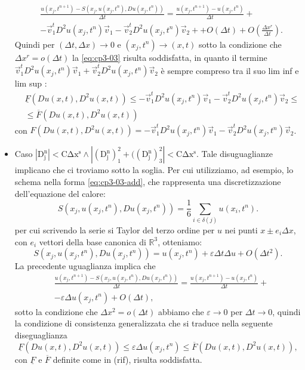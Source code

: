\begin{itemize}
\[\begin{split}
  &\frac{u(x_j,t^{n+1})-S(x_j,u(x_j,t^n),Du(x_j,t^n))}{\Delta t}= \frac{u(x_j,t^{n+1})-u(x_j,t^n)}{\Delta t} + \\
  &  -\vec{v}_1^tD^2u(x_j,t^n)\vec{v}_1 -\vec{v}_2^tD^2u(x_j,t^n)\vec{v}_2 + 
   + O(\Delta t) + O(\frac{\Delta x^r}{\Delta t}).
\end{split}
\]
Quindi per  $(\Delta t,\Delta x)\to 0$ e $(x_j,t^n)\to(x,t)$ sotto la condizione che $\Delta x^r = o(\Delta t)$ la \eqref{eq:cp3-03} risulta soddisfatta, in quanto il termine $\vec{v}_1^tD^2u(x_j,t^n)\vec{v}_1 +\vec{v}_2^tD^2u(x_j,t^n)\vec{v}_2 $ è sempre compreso tra il suo lim inf e lim sup :
\[
\begin{split}
  &\underline{F}(Du(x,t),D^2u(x,t))\le-\vec{v}_1^tD^2u(x_j,t^n)\vec{v}_1
  -\vec{v}_2^tD^2u(x_j,t^n)\vec{v}_2\le \\
  &\le\overline{F}(Du(x,t),D^2u(x,t))
\end{split}
\]
con $F(Du(x,t),D^2u(x,t))=-\vec{v}_1^tD^2u(x_j,t^n)\vec{v}_1 -\vec{v}_2^tD^2u(x_j,t^n)\vec{v}_2$.
  \item \textsf{Caso} $\mathrm{|D_j^n|< C\Delta x^s\land |(D_j^n)_1^2+((D_j^n)_3^2|< C\Delta x^s}$. Tale disuguaglianze implicano che ci troviamo sotto la soglia. Per cui utilizziamo, ad esempio, lo schema nella forma \eqref{eq:cp3-03-add}, che rappresenta una discretizzazione dell'equazione del calore:
\[
S(x_j,u(x_j,t^n),Du(x_j,t^n))=\frac{1}{6}\sum_{i\in\delta(j)}u(x_i,t^n).
\]
per cui scrivendo la serie si Taylor del terzo ordine per $u$ nei punti $x\pm e_i\Delta x$, con $e_i$ vettori della base canonica di $\mathbb{R}^3$, otteniamo:
\[
S(x_j,u(x_j,t^n),Du(x_j,t^n))=u(x_j,t^n) + \varepsilon\Delta t\Delta u + O(\Delta t^2).
\]
La precedente uguaglianza implica che
\[
\begin{split}
  &\frac{u(x_j,t^{n+1})-S(x_j,u(x_j,t^n),Du(x_j,t^n))}{\Delta t}= \frac{u(x_j,t^{n+1})-u(x_j,t^n)}{\Delta t} + \\
  &  -\varepsilon\Delta u(x_j,t^n) + O(\Delta t),
\end{split}
\]
sotto la condizione che $\Delta x^2=o(\Delta t)$ abbiamo che $\varepsilon\to 0$ per $\Delta t\to 0$, quindi la condizione di consistenza generalizzata che si traduce nella seguente diseguaglianza
\[
\underline{F}(Du(x,t),D^2u(x,t))\le\varepsilon\Delta u(x_j,t^n)\le\overline{F}(Du(x,t),D^2u(x,t)),
\]
con $\underline{F}$ e $\overline{F}$ definite come in (rif), risulta soddisfatta.  
\end{itemize}
